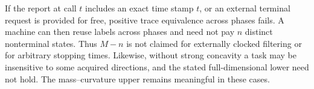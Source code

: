 \begin{remark}\label{rem:clock}
If the report at call $t$ includes an exact time stamp $t$, or an external terminal request is provided for free, positive trace equivalence across phases fails. A machine can then reuse labels across phases and need not pay $n$ distinct nonterminal states. Thus $M-n$ is not claimed for externally clocked filtering or for arbitrary stopping times. Likewise, without strong concavity a task may be insensitive to some acquired directions, and the stated full-dimensional lower need not hold. The mass--curvature upper remains meaningful in these cases.
\end{remark}
